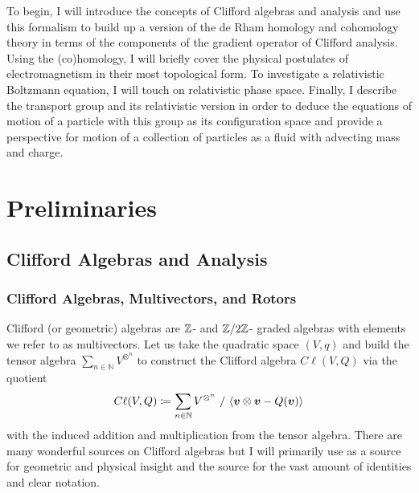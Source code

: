 \documentclass{article}
\begin{document}
To begin, I will introduce the concepts of Clifford algebras and analysis and use this formalism to build up a version of the de Rham homology and cohomology theory in terms of the components of the gradient operator of Clifford analysis. Using the (co)homology, I will briefly cover the physical postulates of electromagnetism in their most topological form. To investigate a relativistic Boltzmann equation, I will touch on relativistic phase space. Finally, I describe the transport group and its relativistic version in order to deduce the equations of motion of a particle with this group as its configuration space and provide a perspective for motion of a collection of particles as a fluid with advecting mass and charge.  

\section{Preliminaries}

\subsection{Clifford Algebras and Analysis}

\subsubsection{Clifford Algebras, Multivectors, and Rotors}

Clifford (or geometric) algebras are $\mathbb{Z}$- and $\mathbb{Z}/2\mathbb{Z}$- graded algebras with elements we refer to as multivectors. Let us take the quadratic space $(V,q)$ and build the tensor algebra $\sum_{n \in \mathbb{N}} V^{\otimes^n}$ to construct the Clifford algebra $C\ell(V,Q)$ via the quotient
\begin{equation}
C\ell(V,Q) \coloneqq \sum_{n \in \mathbb{N}} V^{\otimes^n} ~ / ~ \langle \boldsymbol{v} \otimes \boldsymbol{v} - Q(\boldsymbol{v}) \rangle
\end{equation}
with the induced addition and multiplication from the tensor algebra. There are many wonderful sources on Clifford algebras but I will primarily use \cite{doran_geometric_2003} as a source for geometric and physical insight and the source \cite{chisolm_geometric_2012} for the vast amount of identities and clear notation. 
\end{document}
